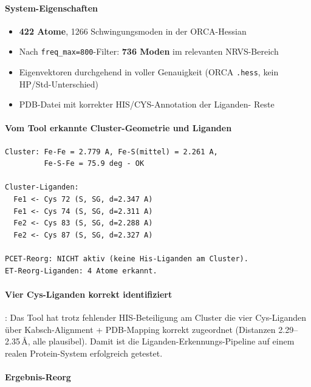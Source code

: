 \documentclass[11pt,a4paper,twoside]{article}
\providecommand{\angstrom}{\text{\AA}}    %
\theoremstyle{remark}
\begin{document}
\paragraph{System-Eigenschaften}
\begin{itemize}\setlength{\itemsep}{0pt}
  \item \textbf{422 Atome}, 1266 Schwingungsmoden in der ORCA-Hessian
  \item Nach \texttt{freq\_max=800}-Filter: \textbf{736 Moden} im
        relevanten NRVS-Bereich
  \item Eigenvektoren durchgehend in voller Genauigkeit
        (ORCA \texttt{.hess}, kein HP/Std-Unterschied)
  \item PDB-Datei mit korrekter HIS/CYS-Annotation der Liganden-
        Reste
\end{itemize}

\paragraph{Vom Tool erkannte Cluster-Geometrie und Liganden}

\begin{verbatim}
Cluster: Fe-Fe = 2.779 A, Fe-S(mittel) = 2.261 A,
         Fe-S-Fe = 75.9 deg - OK

Cluster-Liganden:
  Fe1 <- Cys 72 (S, SG, d=2.347 A)
  Fe1 <- Cys 74 (S, SG, d=2.311 A)
  Fe2 <- Cys 83 (S, SG, d=2.288 A)
  Fe2 <- Cys 87 (S, SG, d=2.327 A)

PCET-Reorg: NICHT aktiv (keine His-Liganden am Cluster).
ET-Reorg-Liganden: 4 Atome erkannt.
\end{verbatim}

\paragraph{Vier Cys-Liganden korrekt identifiziert}: Das Tool hat
trotz fehlender HIS-Beteiligung am Cluster die vier Cys-Liganden
\"uber Kabsch-Alignment + PDB-Mapping korrekt zugeordnet
(Distanzen 2.29--2.35\,$\angstrom$, alle plausibel). Damit ist die
Liganden-Erkennungs-Pipeline auf einem realen Protein-System
erfolgreich getestet.

\paragraph{Ergebnis-Reorg}
\end{document}
